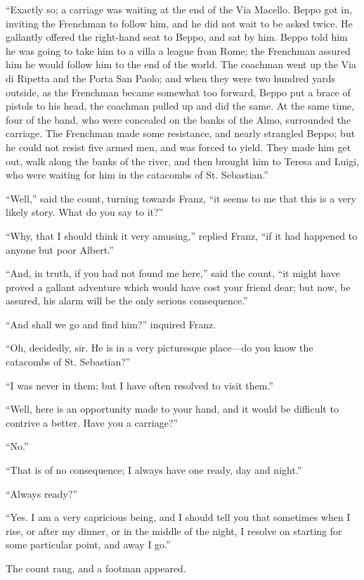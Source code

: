 “Exactly so; a carriage was waiting at the end of the Via Macello.
Beppo got in, inviting the Frenchman to follow him, and he did not wait
to be asked twice. He gallantly offered the right-hand seat to Beppo,
and sat by him. Beppo told him he was going to take him to a villa a
league from Rome; the Frenchman assured him he would follow him to the
end of the world. The coachman went up the Via di Ripetta and the Porta
San Paolo; and when they were two hundred yards outside, as the
Frenchman became somewhat too forward, Beppo put a brace of pistols to
his head, the coachman pulled up and did the same. At the same time,
four of the band, who were concealed on the banks of the Almo,
surrounded the carriage. The Frenchman made some resistance, and nearly
strangled Beppo; but he could not resist five armed men, and was forced
to yield. They made him get out, walk along the banks of the river, and
then brought him to Teresa and Luigi, who were waiting for him in the
catacombs of St. Sebastian.”

“Well,” said the count, turning towards Franz, “it seems to me that
this is a very likely story. What do you say to it?”

“Why, that I should think it very amusing,” replied Franz, “if it had
happened to anyone but poor Albert.”

“And, in truth, if you had not found me here,” said the count, “it
might have proved a gallant adventure which would have cost your friend
dear; but now, be assured, his alarm will be the only serious
consequence.”

“And shall we go and find him?” inquired Franz.

“Oh, decidedly, sir. He is in a very picturesque place—do you know the
catacombs of St. Sebastian?”

“I was never in them; but I have often resolved to visit them.”

“Well, here is an opportunity made to your hand, and it would be
difficult to contrive a better. Have you a carriage?”

“No.”

“That is of no consequence; I always have one ready, day and night.”

“Always ready?”

“Yes. I am a very capricious being, and I should tell you that
sometimes when I rise, or after my dinner, or in the middle of the
night, I resolve on starting for some particular point, and away I go.”

The count rang, and a footman appeared.

